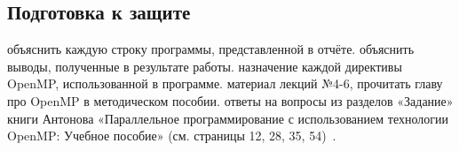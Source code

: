 \subsection{Подготовка к защите}

\begin{enumerate}
     объяснить каждую строку программы, представленной в отчёте.
     объяснить выводы, полученные в результате работы.
     назначение каждой директивы OpenMP, использованной в программе.
     материал лекций №4-6, прочитать главу про OpenMP в методическом пособии.
     ответы на вопросы из разделов «Задание» книги Антонова «Параллельное программирование с использованием технологии OpenMP: Учебное пособие» (см. страницы 12, 28, 35, 54)~\cite{AntonovOpenMP2004}.
\end{enumerate}
